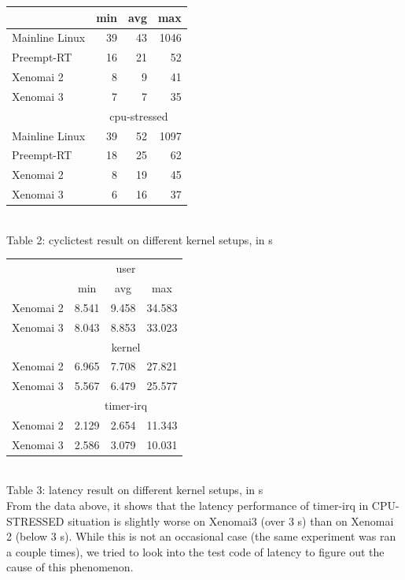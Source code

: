 \documentclass[10pt,a4paper]{article}
\begin{document}
\begin{multicols}{2}
\begin{tabular}{|l|r|r|r|}
 & \multicolumn{1}{l|}{min} & \multicolumn{1}{l|}{avg} & \multicolumn{1}{l|}{max} \\ \hline
Mainline Linux & 39 & 43 & 1046  \\ \hline
Preempt-RT & 16 & 21 & 52 \\ \hline
Xenomai 2 & 8 & 9 & 41 \\ \hline
Xenomai 3 & 7 & 7 & 35 \\ \hline
 & \multicolumn{3}{c|}{cpu-stressed} \\ \hline
Mainline Linux & 39 & 52 & 1097 \\ \hline
Preempt-RT & 18 & 25 & 62 \\ \hline
Xenomai 2 & 8 & 19 & 45 \\ \hline
Xenomai 3 & 6 & 16 & 37 \\ \hline
\end{tabular}\\
Table 2: cyclictest result on different kernel setups, in \textmu s\\
\begin{tabular}{|l|c|r|r|}
\hline
\multirow{2}{*}{} & \multicolumn{3}{c|}{user} \\ \cline{2-4} 
 & min & \multicolumn{1}{c|}{avg} & \multicolumn{1}{c|}{max} \\ \hline
Xenomai 2 & 8.541 & 9.458 & 34.583 \\ \hline
Xenomai 3 & 8.043 & 8.853 & 33.023 \\ \hline
& \multicolumn{3}{c|}{kernel}      \\ \hline
Xenomai 2 & 6.965 & 7.708 & 27.821 \\ \hline
Xenomai 3 & 5.567 & 6.479 & 25.577 \\ \hline
& \multicolumn{3}{c|}{timer-irq}   \\ \hline
Xenomai 2 & 2.129 & 2.654 & 11.343 \\ \hline
Xenomai 3 & 2.586 & 3.079 & 10.031 \\ \hline
\end{tabular} \\
Table 3: latency result on different kernel setups, in \textmu s\\

From the data above, it shows that the latency performance of timer-irq in CPU-STRESSED situation is slightly worse on Xenomai3 (over 3 \textmu s) than on Xenomai 2 (below 3 \textmu s). While this is not an occasional case (the same experiment was ran a couple times), we tried to look into the test code of latency to figure out the cause of this phenomenon.


\end{multicols}
\end{document}
